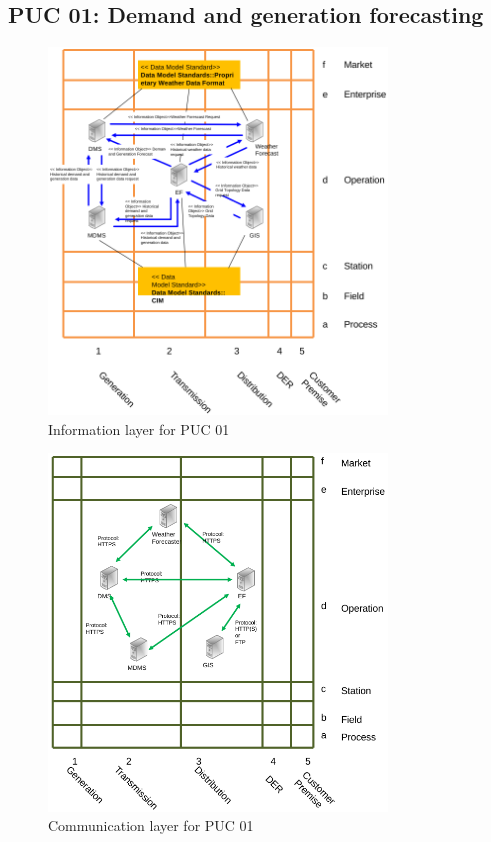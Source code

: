 \subsection*{PUC 01: Demand and generation forecasting}


\begin{figure}[!htb]\centering
  \includegraphics[width=9cm]{Data/i1.png}
\caption{Information layer for PUC 01}
\label{fig:i1}
\end{figure}


\begin{figure}[!htb]\centering
  \includegraphics[width=9cm]{Data/c1.png}
\caption{Communication layer for PUC 01}
\label{fig:c1}
\end{figure}






